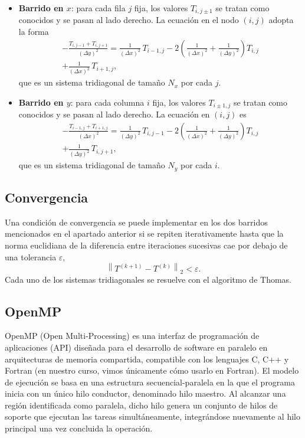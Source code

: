 \documentclass[12pt,twocolumn]{article}
\begin{document}
\begin{itemize}
  \item \textbf{Barrido en $x$}: para cada fila $j$ fija, los valores $T_{i,j\pm1}$ se tratan como conocidos y se pasan al lado derecho. La ecuación en el nodo $(i,j)$ adopta la forma
  \begin{multline}
    -\frac{T_{i,j-1}+T_{i,j+1}}{(\Delta y)^2}
    =
    \frac{1}{(\Delta x)^2}\,T_{i-1,j}
    - 2\!\left(\frac{1}{(\Delta x)^2}+\frac{1}{(\Delta y)^2}\right)T_{i,j}
    \\+ \frac{1}{(\Delta x)^2}\,T_{i+1,j},
    \label{eq:sweepx}
  \end{multline}
  que es un sistema tridiagonal de tamaño $N_x$ por cada $j$.

  \item \textbf{Barrido en $y$}: para cada columna $i$ fija, los valores $T_{i\pm1,j}$ se tratan como conocidos y se pasan al lado derecho. La ecuación en $(i,j)$ es
  \begin{multline}
     -\frac{T_{i-1,j}+T_{i+1,j}}{(\Delta x)^2}
    =
    \frac{1}{(\Delta y)^2}\,T_{i,j-1}
    - 2\!\left(\frac{1}{(\Delta x)^2}+\frac{1}{(\Delta y)^2}\right)T_{i,j}
    \\+ \frac{1}{(\Delta y)^2}\,T_{i,j+1},
    \label{eq:sweepy}
  \end{multline}
  que es un sistema tridiagonal de tamaño $N_y$ por cada $i$.
\end{itemize}


\subsection{Convergencia}

Una condición de convergencia se puede implementar en los dos barridos mencionados en el apartado anterior si se repiten iterativamente hasta que la norma euclidiana de la diferencia entre iteraciones sucesivas cae por debajo de una tolerancia $\varepsilon$,
$$
  \left\|T^{(k+1)} - T^{(k)}\right\|_2 < \varepsilon.
$$
Cada uno de los sistemas tridiagonales se resuelve con el algoritmo de Thomas.

\subsection{OpenMP}
OpenMP (Open Multi-Processing) es una interfaz de programación de aplicaciones (API) diseñada para el desarrollo de software en paralelo en arquitecturas de memoria compartida, compatible con los lenguajes C, C++ y Fortran (en nuestro curso, vimos únicamente cómo usarlo en Fortran). El modelo de ejecución se basa en una estructura secuencial-paralela en la que el programa inicia con un único hilo conductor, denominado hilo maestro. Al alcanzar una región identificada como paralela, dicho hilo genera un conjunto de hilos de soporte que ejecutan las tareas simultáneamente, integrándose nuevamente al hilo principal una vez concluida la operación.
\end{document}
